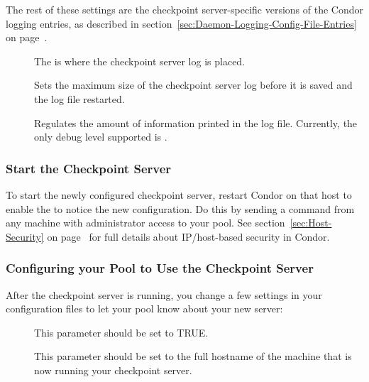 The rest of these settings are the checkpoint server-specific versions
of the Condor logging entries, as described in
section~\ref{sec:Daemon-Logging-Config-File-Entries} on
page~\pageref{sec:Daemon-Logging-Config-File-Entries}.
\begin{description}

\item[] The  is where the
checkpoint server log is placed.

\item[] Sets the maximum
size of the checkpoint server log before it is saved and the
log file restarted.

\item[] Regulates
the amount of information
printed in the log file.
Currently, the only debug level supported is .

\end{description}

\subsubsection{\label{sec:Start-Ckpt-Server} 
Start the Checkpoint Server} 

To start the newly configured checkpoint server,
restart Condor on that host to enable
the  to notice the new configuration.
Do this by sending a  command from any machine
with administrator access to your pool.
See section~\ref{sec:Host-Security} on
page~\pageref{sec:Host-Security} for full details about IP/host-based
security in Condor.

\subsubsection{\label{sec:Configure-Pool-Ckpt-Server} 
Configuring your Pool to Use the Checkpoint Server}

After the checkpoint server is running, you
change a few settings in your configuration files to let your pool know
about your new server:

\begin{description}
   \item[] This parameter should be set to
   TRUE.

   \item[] This parameter should be set to
   the full hostname of the machine that is now running your checkpoint
   server.  
\end{description}

